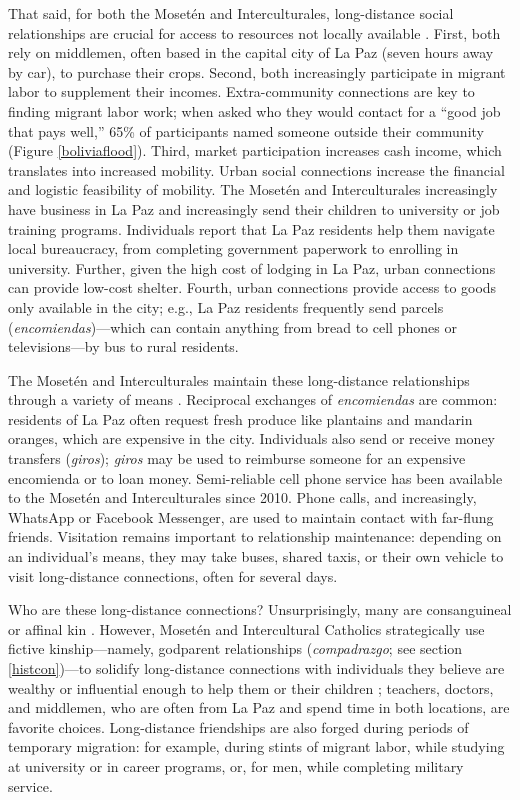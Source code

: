 \documentclass[bibauthoryear]{aa}
\begin{document}
That said, for both the Moset\'en and Interculturales, long-distance social relationships are crucial for access to resources not locally available \citep{pisorjones2020}.
 First, both rely on middlemen, often based in the capital city of La Paz (seven hours away by car), to purchase their crops. Second, both increasingly participate in migrant labor to supplement their incomes. Extra-community connections are key to finding migrant labor work; when asked who they would contact for a ``good job that pays well,'' 65\% of participants named someone outside their community (Figure \ref{boliviaflood}). Third, market participation increases cash income, which translates into increased mobility. Urban social connections increase the financial and logistic feasibility of mobility. The Moset\'en and Interculturales increasingly have business in La Paz and increasingly send their children to university or job training programs. Individuals report that La Paz residents help them navigate local bureaucracy, from completing government paperwork to enrolling in university. Further, given the high cost of lodging in La Paz, urban connections can provide low-cost shelter. Fourth, urban connections provide access to goods only available in the city; e.g., La Paz residents frequently send parcels (\textit{encomiendas})---which can contain anything from bread to cell phones or televisions---by bus to rural residents.

	The Moset\'en and Interculturales maintain these long-distance relationships through a variety of means \citep{pisorjones2020}. Reciprocal exchanges of \emph{encomiendas} are common: residents of La Paz often request fresh produce like plantains and mandarin oranges, which are expensive in the city. Individuals also send or receive money transfers (\textit{giros}); \textit{giros} may be used to reimburse someone for an expensive encomienda or to loan money. Semi-reliable cell phone service has been available to the Moset\'en and Interculturales since 2010. Phone calls, and increasingly, WhatsApp or Facebook Messenger, are used to maintain contact with far-flung friends. Visitation remains important to relationship maintenance: depending on an individual's means, they may take buses, shared taxis, or their own vehicle to visit long-distance connections, often for several days.
	
	Who are these long-distance connections? Unsurprisingly, many are consanguineal or affinal kin \citep{pisorjones2020}. However, Moset\'en and Intercultural Catholics strategically use fictive kinship---namely, godparent relationships (\emph{compadrazgo}; see section \ref{histcon})---to solidify long-distance connections with individuals they believe are wealthy or influential enough to help them or their children \citep{mintz1950analysis}; teachers, doctors, and middlemen, who are often from La Paz and spend time in both locations, are favorite choices. Long-distance friendships are also forged during periods of temporary migration: for example, during stints of migrant labor, while studying at university or in career programs, or, for men, while completing  military service.
	
\end{document}
